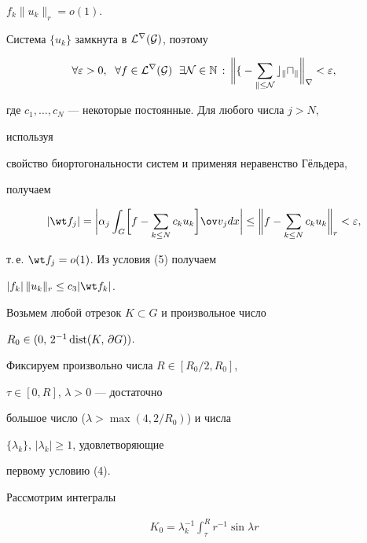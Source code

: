 {\begin{lem}
$f_k\|u_k\|_r=o(1)$.


\end{lem}





\begin{pf} Система $\{u_k\}$ замкнута в $\cal L^r(G)$, поэтому


$$


\forall\varepsilon>0, \ \;\forall f\in\cal L^r(G) \ \;


\exists N\in\Bbb N\, : \,


\biggl\|f-\sum_{k\le N}c_k u_k\biggr\|_r<\varepsilon,


$$


где $c_1,\dotsc,c_N$ --- некоторые постоянные. Для любого числа $j>N$,


используя


свойство биортогональности систем и применяя неравенство Г\"ельдера,


получаем


$$


|\wt f_j|=\biggl|\alpha_j\int_G\biggl[f-\sum_{k\le N}c_k u_k


\biggr]\ov v_j dx\biggr|\le\biggl\|f-\sum_{k\le N}


c_k u_k\biggr\|_r<\varepsilon,


$$


т.\,е. $\wt f_j=o(1)$. Из условия (5) получаем


$|f_k|\,\|u_k\|_r\le c_3|\wt f_k|$.


\end{pf}





Возьмем любой отрезок $K\subset G$ и произвольное число


$R_0\in(0,\,2^{-1}\operatorname{dist}(K,\,\partial G))$.


Фиксируем произвольно числа $R\in[R_0/2,R_0]$,


$\tau\in[0,R]$, $\lambda>0$ --- достаточно


большое число ($\lambda>\max(4,2/R_0)$) и числа


$\{\lambda_k\},\,|\lambda_k|\ge 1$, удовлетворяющие


первому условию (4).


Рассмотрим интегралы


\begin{gather*}


K_0=\lambda^{-1}_k\int^R_\tau r^{-1}\sin\lambda r



\end{gather*}}
